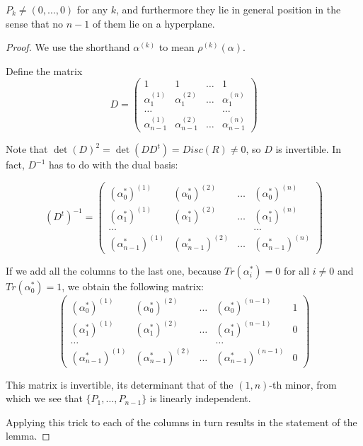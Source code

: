 \documentclass{report}
\begin{document}
\begin{lemma} \label{X_R well-defined}
$P_k \neq (0,\ldots,0)$ for any $k$, and furthermore they lie in general position in the sense that no $n-1$ of them lie on a hyperplane.
\end{lemma}
\begin{proof}
We use the shorthand $\alpha^{(k)}$ to mean $\rho^{(k)}(\alpha)$.

Define the matrix
\begin{equation}
D = \begin{pmatrix}
1 & 1 & \ldots & 1 \\
\alpha_1^{(1)} & \alpha_1^{(2)} & \ldots & \alpha_1^{(n)} \\
\ldots & & & \ldots \\
\alpha_{n-1}^{(1)} & \alpha_{n-1}^{(2)} & \ldots & \alpha_{n-1}^{(n)}
\end{pmatrix}
\end{equation}

Note that $\det(D)^2 = \det(D D^t) = Disc(R) \neq 0$, so $D$ is invertible.  In fact, $D^{-1}$ has to do with the dual basis:

\begin{equation}
(D^t)^{-1} = \begin{pmatrix}
(\alpha_0^*)^{(1)} & (\alpha_0^*)^{(2)} & \ldots & (\alpha_0^*)^{(n)} \\
(\alpha_1^*)^{(1)} & (\alpha_1^*)^{(2)} & \ldots & (\alpha_1^*)^{(n)} \\
\ldots & & & \ldots \\
(\alpha_{n-1}^*)^{(1)} & (\alpha_{n-1}^*)^{(2)} & \ldots & (\alpha_{n-1}^*)^{(n)}
\end{pmatrix}
\end{equation}

If we add all the columns to the last one, because $Tr(\alpha_i^*) = 0$ for all $i \neq 0$ and $Tr(\alpha_0^*) = 1$, we obtain the following matrix:
\begin{equation}
\begin{pmatrix}
(\alpha_0^*)^{(1)} & (\alpha_0^*)^{(2)} & \ldots & (\alpha_0^*)^{(n-1)} & 1 \\
(\alpha_1^*)^{(1)} & (\alpha_1^*)^{(2)} & \ldots & (\alpha_1^*)^{(n-1)} & 0 \\
\ldots & & & \ldots \\
(\alpha_{n-1}^*)^{(1)} & (\alpha_{n-1}^*)^{(2)} & \ldots & (\alpha_{n-1}^*)^{(n-1)} & 0
\end{pmatrix}
\end{equation}

This matrix is invertible, its determinant that of the $(1,n)$-th minor, from which we see that $\{ P_1, \ldots, P_{n-1} \}$ is linearly independent.

Applying this trick to each of the columns in turn results in the statement of the lemma.
\end{proof}
\end{document}
